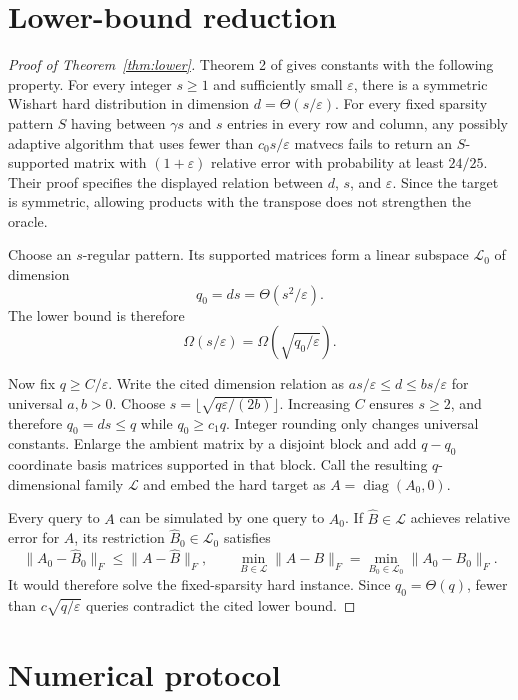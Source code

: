 \documentclass{article}
\theoremstyle{remark}
\newcommand{\cL}{\mathcal L}
\newcommand{\eps}{\varepsilon}
\newcommand{\1}{\mathbf 1}
\begin{document}
\section{Lower-bound reduction}
\label{app:lower}

\begin{proof}[Proof of Theorem~\ref{thm:lower}]
Theorem 2 of \citet{amsel2026fixed} gives constants with the following property.  For every integer $s\ge1$ and sufficiently small $\eps$, there is a symmetric Wishart hard distribution in dimension $d=\Theta(s/\eps)$.  For every fixed sparsity pattern $S$ having between $\gamma s$ and $s$ entries in every row and column, any possibly adaptive algorithm that uses fewer than $c_0s/\eps$ matvecs fails to return an $S$-supported matrix with $(1+\eps)$ relative error with probability at least $24/25$.  Their proof specifies the displayed relation between $d$, $s$, and $\eps$.  Since the target is symmetric, allowing products with the transpose does not strengthen the oracle.

Choose an $s$-regular pattern.  Its supported matrices form a linear subspace $\cL_0$ of dimension \[ q_0=ds=\Theta(s^2/\eps). \] The lower bound is therefore \[ \Omega(s/\eps)=\Omega(\sqrt{q_0/\eps}). \]

Now fix $q\ge C/\eps$.  Write the cited dimension relation as $a s/\eps\le d\le b s/\eps$ for universal $a,b>0$.  Choose $s=\lfloor\sqrt{q\eps/(2b)}\rfloor$.  Increasing $C$ ensures $s\ge2$, and therefore $q_0=ds\le q$ while $q_0\ge c_1q$.  Integer rounding only changes universal constants.  Enlarge the ambient matrix by a disjoint block and add $q-q_0$ coordinate basis matrices supported in that block.  Call the resulting $q$-dimensional family $\cL$ and embed the hard target as $A=\operatorname{diag}(A_0,0)$.

Every query to $A$ can be simulated by one query to $A_0$.  If $\widehat B\in\cL$ achieves relative error for $A$, its restriction $\widehat B_0\in\cL_0$ satisfies \[ \|A_0-\widehat B_0\|_F \le\|A-\widehat B\|_F, \qquad \min_{B\in\cL}\|A-B\|_F =\min_{B_0\in\cL_0}\|A_0-B_0\|_F. \] It would therefore solve the fixed-sparsity hard instance.  Since $q_0=\Theta(q)$, fewer than $c\sqrt{q/\eps}$ queries contradict the cited lower bound.
\end{proof}

\section{Numerical protocol}
\label{app:numerics}
\end{document}
